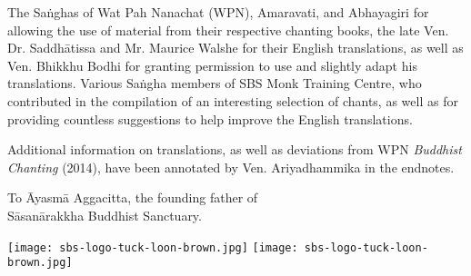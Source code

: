\cleartorecto
\thispagestyle{empty}

{\setlength{\parskip}{10pt}

  \fi

  \fi


  The Saṅghas of Wat Pah Nanachat (WPN), Amaravati, and Abhayagiri for allowing the use of material from their respective chanting books, the late Ven. Dr. Saddhātissa and Mr. Maurice Walshe for their English translations, as well as Ven. Bhikkhu Bodhi for granting permission to use and slightly adapt his translations. Various Saṅgha members of SBS Monk Training Centre, who contributed in the compilation of an interesting selection of chants, as well as for providing countless suggestions to help improve the English translations.

  Additional information on translations, as well as deviations\makeatletter\hyperlink{endnote1-appendix}\makeatother\thickspace
  from WPN \textit{Buddhist Chanting} (2014), have been annotated by Ven. Ariyadhammika in the endnotes.

  \medskip

  {\centering
    To Āyasmā Aggacitta, the founding father of\\
    Sāsanārakkha Buddhist Sanctuary.

    \medskip

    \ifafiveversion \texttt{[image: sbs-logo-tuck-loon-brown.jpg]} \fi
    \ifasixversion \texttt{[image: sbs-logo-tuck-loon-brown.jpg]} \fi

  }

}
